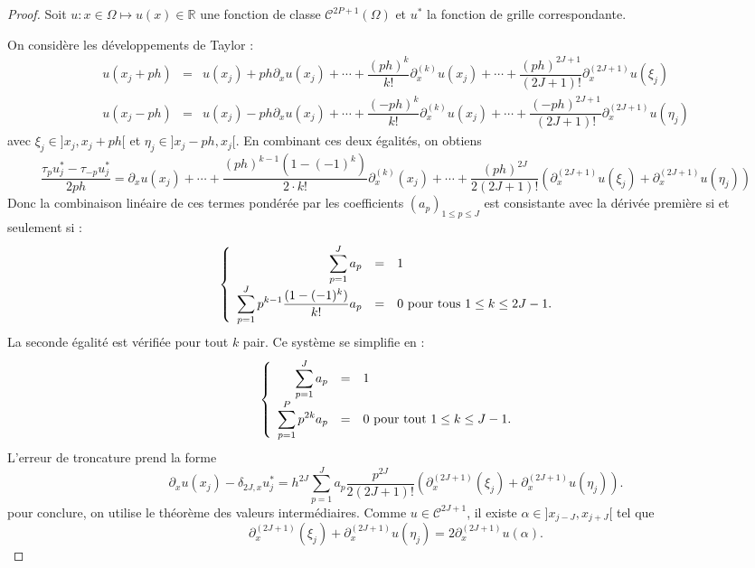 \begin{proof}
Soit $u : x \in \Omega \mapsto u(x) \in \mathbb{R}$ une fonction de classe $\mathcal{C}^{2P+1}( \Omega)$ et $u^*$ la fonction de grille correspondante.

On considère les développements de Taylor :
\begin{equation}
\begin{array}{rcl}
u(x_j + ph) & = & u(x_j) + p h \partial_x u(x_j) + \cdots + \dfrac{(ph)^k}{k!}\partial_x^{(k)}u(x_j) + \cdots +\dfrac{(ph)^{2J+1}}{(2J+1)!} \partial_x^{(2J+1)}u (\xi_j)\\
u(x_j - ph) & = & u(x_j) - p h \partial_x u(x_j) + \cdots + \dfrac{(-ph)^k}{k!}\partial_x^{(k)}u(x_j) + \cdots +\dfrac{(-ph)^{2J+1}}{(2J+1)!} \partial_x^{(2J+1)}u(\eta_j)
\end{array}
\end{equation}
avec $\xi_j \in ]x_j, x_j+ph[$ et $\eta_j \in ]x_j-ph, x_j[$. En combinant ces deux égalités, on obtiens
\begin{equation}
\dfrac{\tau_p u^*_j - \tau_{-p} u^*_j}{2ph} = \partial_x u(x_j) + \cdots + \dfrac{(ph)^{k-1}(1 - (-1)^k)}{2 \cdot k!} \partial_x^{(k)}(x_j) + \cdots +\dfrac{(ph)^{2J}}{2(2J+1)!} \left( \partial^{(2J+1)}_x u(\xi_j) + \partial_x^{(2J+1)}u(\eta_j) \right)
\end{equation}
Donc la combinaison linéaire de ces termes pondérée par les coefficients $(a_p)_{1 \leq p \leq J}$ est consistante avec la dérivée première si et seulement si :
\begin{equation}
\left\lbrace
\begin{array}{rcll}
\displaystyle\sum\limits_{p=1}^J a_p & = & 1 & \\
\displaystyle\sum\limits_{p=1}^J p^{k-1} \dfrac{(1 - (-1)^k)}{k!} a_p & = & 0 \text{ pour tous } 1 \leq k \leq 2J-1.
\end{array}
\right.
\end{equation}
La seconde égalité est vérifiée pour tout $k$ pair. Ce système se simplifie en :
\begin{equation}
\left\lbrace
\begin{array}{rcll}
\displaystyle\sum\limits_{p=1}^J a_p & = & 1 & \\
\displaystyle\sum\limits_{p=1}^P p^{2k} a_p & = & 0 \text{ pour tout } 1 \leq k \leq J-1.
\end{array}
\right.
\end{equation}
L'erreur de troncature prend la forme
\begin{equation}
\partial_x u(x_j) - \delta_{2J,x} u^*_j = h^{2J} \sum_{p=1}^J a_p \dfrac{p^{2J}}{2(2J+1)!} \left( \partial_x^{(2J+1)}(\xi_j) + \partial_x^{(2J+1)}u(\eta_j) \right).
\end{equation}
pour conclure, on utilise le théorème des valeurs intermédiaires. Comme $u \in \mathcal{C}^{2J+1}$, il existe $\alpha \in ]x_{j-J}, x_{j+J}[$ tel que
\begin{equation}
\partial_x^{(2J+1)}(\xi_j) + \partial_x^{(2J+1)}u(\eta_j) = 2 \partial_x^{(2J+1)}u(\alpha).
\end{equation}
\end{proof}

